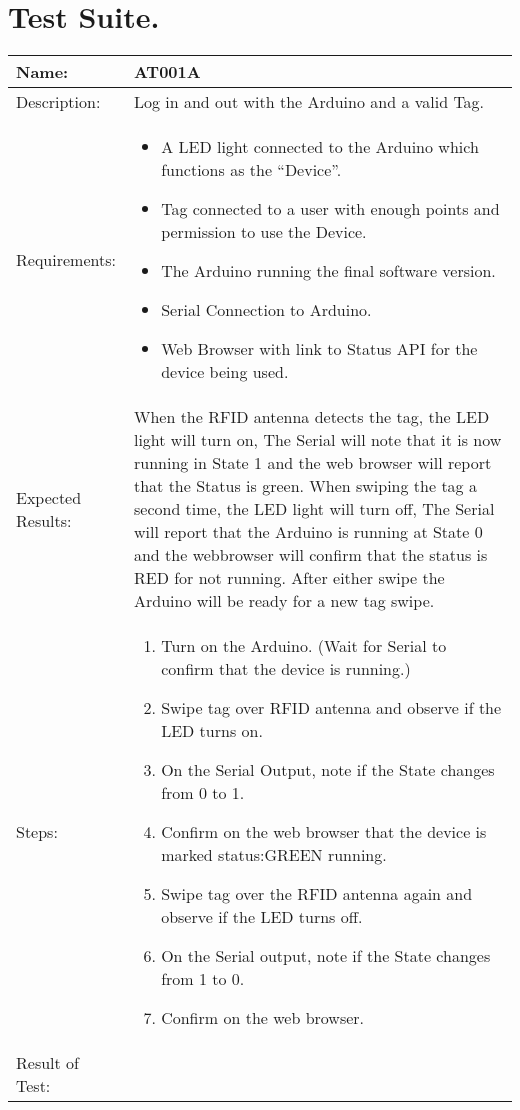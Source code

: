 \section{Test Suite.}

\begin{table}[h]
	\centering
		\begin{tabular*}{\textwidth}{|l|l|}
		\hline
		\hline
		Name: & AT001A\\
		\hline
		Description: & Log in and out with the Arduino and a valid Tag.\\
		\hline
		Requirements: & \parbox{0.85\textwidth}{
		\begin{itemize}
		  \item A LED light connected to the Arduino which functions as the ``Device''.
			\item Tag connected to a user with enough points and permission to use the Device.
			\item The Arduino running the final software version.
			\item Serial Connection to Arduino.
			\item Web Browser with link to Status API for the device being used.
		\end{itemize}}\\
		\hline
		Expected Results: & \parbox{.85\textwidth}{When the RFID antenna detects the tag, the LED light will turn on, The Serial will note that it is now running in State 1 and the web browser will report that the Status is green.
		When swiping the tag a second time, the LED light will turn off, The Serial will report that the Arduino is running at State 0 and the webbrowser will confirm that the status is RED for not running.
		After either swipe the Arduino will be ready for a new tag swipe.}\\
		\hline
		Steps: & \parbox{.85\textwidth}{
		\begin{enumerate}
			\item Turn on the Arduino. (Wait for Serial to confirm that the device is running.)
			\item Swipe tag over RFID antenna and observe if the LED turns on.
			\item On the Serial Output, note if the State changes from 0 to 1.
			\item Confirm on the web browser that the device is marked status:GREEN  running.
			\item Swipe tag over the RFID antenna again and observe if the LED turns off.
			\item On the Serial output, note if the State changes from 1 to 0.
			\item Confirm on the web browser.
		\end{enumerate}}
		\\

		\hline
		Result of Test: & \\
		\hline
		\end{tabular*}
\end{table}

